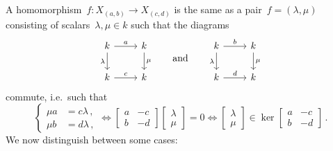 \section{}

A homomorphism~$f \colon X_{(a,b)} \to X_{(c,d)}$ is the same as a pair~$f = (\lambda, \mu)$ consisting of scalars~$\lambda, \mu \in k$ such that the diagrams
\[
  \begin{tikzcd}
      k
      \arrow{r}[above]{a}
      \arrow{d}[left]{\lambda}
    & k
      \arrow{d}[right]{\mu}
    \\
      k
      \arrow{r}[above]{c}
    & k
  \end{tikzcd}
  \qquad\text{and}\qquad
  \begin{tikzcd}
      k
      \arrow{r}[above]{b}
      \arrow{d}[left]{\lambda}
    & k
      \arrow{d}[right]{\mu}
    \\
      k
      \arrow{r}[above]{d}
    & k
  \end{tikzcd}
\]
commute, i.e.\ such that
\[
  \left\{
    \begin{aligned}
      \mu a &= c \lambda \,, \\
      \mu b &= d \lambda \,,
    \end{aligned}
  \right.
  \iff
  \begin{bmatrix}
    a & -c  \\
    b & -d
  \end{bmatrix}
  \begin{bmatrix}
    \lambda \\
    \mu
  \end{bmatrix}
  = 0
  \iff
  \begin{bmatrix}
    \lambda \\
    \mu
  \end{bmatrix}
  \in \ker
  \begin{bmatrix}
    a & -c  \\
    b & -d
  \end{bmatrix} \,.
\]
We now distinguish between some cases:
